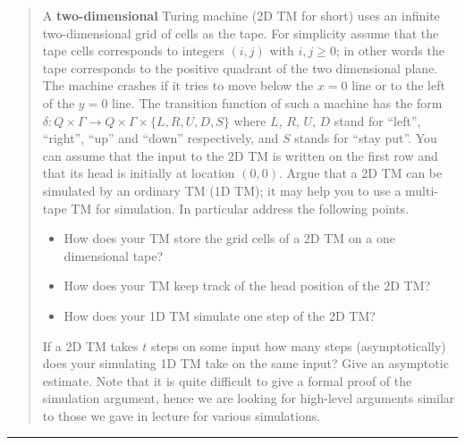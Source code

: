 \documentclass[11pt]{article}
\begin{document}



\begin{quote}
    A {\bf two-dimensional} Turing machine (2D TM for short) uses an infinite
  two-dimensional grid of cells as the tape. For simplicity assume
  that the tape cells corresponds to integers $(i,j)$ with $i,j \ge 0$;
  in other words the tape corresponds to the positive quadrant of the
  two dimensional plane. The machine crashes if it tries to move below
  the $x=0$ line or to the left of the $y=0$ line.  The transition
  function of such a machine has the form
  $\delta: Q \times \Gamma \rightarrow Q \times \Gamma \times
  \{L,R,U,D,S\}$ where $L$, $R$, $U$, $D$ stand for ``left'',
  ``right'', ``up'' and ``down'' respectively, and $S$ stands for
  ``stay put''. You can assume that the input to the 2D TM is written
  on the first row and that its head is initially at location $(0,0)$.
  Argue that a 2D TM can be simulated by an
  ordinary TM (1D TM); it may help you to use a multi-tape TM for
  simulation. In particular address the following points.
  \begin{itemize}
  \item How does your TM store the grid cells of a 2D TM on a one dimensional
    tape?
  \item How does your TM keep track of the head position of the
    2D TM?
  \item How does your 1D TM simulate one step of the
    2D TM?
  \end{itemize}
  If a 2D TM takes $t$ steps on some input how many steps
  (asymptotically) does your simulating 1D TM take on the same input?
  Give an asymptotic estimate. Note that it is quite difficult to give
  a formal proof of the simulation argument, hence we are looking for
  high-level arguments similar to those we gave in lecture for various
  simulations.

\end{quote}
\hrule
\end{document}

